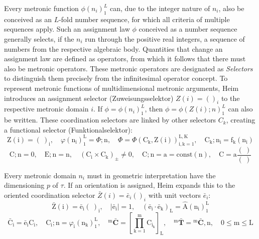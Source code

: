 \documentclass[12pt]{article}
\begin{document}
Every metronic function \( \phi(n_i)_1^L \) can, due to the integer nature of \( n_i \), also be conceived as an \( L \)-fold number sequence, for which all criteria of multiple sequences apply. Such an assignment law \( \phi \) conceived as a number sequence generally selects, if the \( n_i \) run through the positive real integers, a sequence of numbers from the respective algebraic body. Quantities that change an assignment law are defined as operators, from which it follows that there must also be metronic operators. These metronic operators are designated as \textit{Selectors} to distinguish them precisely from the infinitesimal operator concept. 
To represent metronic functions of multidimensional metronic arguments, Heim introduces an assignment selector (Zuweisungsselektor) \( Z(i) = ()_i \) to the respective metronic domain \( i \). If \( \phi = \phi(n_i)_1^L \), then \( \phi = \phi(Z(i); n)_1^L \) can also be written. These coordination selectors are linked by other selectors \( C_k \), creating a functional selector (Funktionalselektor):
\begin{equation}
\mathrm{Z(i)} = (\ )_\mathrm{i}, \quad \varphi(\mathrm{n_i})_1^\mathrm{L} = \Phi;\mathrm{n}, \quad \Phi = \Phi(\mathrm{C_k}, \mathrm{Z(i)})_{\mathrm{i,k=1}}^{\mathrm{L,K}}, \quad \mathrm{C_k};\mathrm{n_i} = \mathrm{f_k}(\mathrm{n_i}) \tag{78}
\end{equation}
\begin{equation}
\mathrm{C};\mathrm{n} = 0, \quad \mathrm{E};\mathrm{n} = \mathrm{n}, \quad (\mathrm{C_i} \times \mathrm{C_k})_\pm \neq 0, \quad \mathrm{C};\mathrm{n} = \mathrm{a} = \text{const}(\mathrm{n}), \quad \mathrm{C} = \mathrm{a} \frac{(\ )}{(\ )} \tag{78a}
\end{equation}

Every metronic domain \( n_i \) must in geometric interpretation have the dimensioning \( p \) of \( \tau \). If an orientation is assigned, Heim expands this to the oriented coordination selector \( \bar{Z}(i) = \bar{e}_i ()_i \) with unit vectors \( \bar{e}_i \):
\begin{equation}
\bar{\mathrm{Z}}(\mathrm{i}) = \bar{\mathrm{e}}_\mathrm{i} (\ )_\mathrm{i}, \quad |\bar{\mathrm{e}}_\mathrm{i}| = 1, \quad (\bar{\mathrm{e}}_\mathrm{i} \cdot \bar{\mathrm{e}}_\mathrm{k})_\mathrm{L} = \hat{\mathrm{A}}(\mathrm{n_i})_1^\mathrm{L} \tag{78b}
\end{equation}
\begin{equation}
\bar{\mathrm{C}}_\mathrm{i} = \bar{\mathrm{e}}_\mathrm{i} \mathrm{C_i}, \quad \mathrm{C_i};\mathrm{n} = \varphi_\mathrm{i}(\mathrm{n_k})_1^\mathrm{L}, \quad {}^\mathrm{m}\bar{\mathbf{C}} = \left[ \prod_{\mathrm{k}=1}^\mathrm{m} \mathrm{C}_{\mathrm{i_k}} \right]_\mathrm{L}, \quad {}^\mathrm{m}\bar{\mathbf{T}} = {}^\mathrm{m}\bar{\mathbf{C}}, \mathrm{n}, \quad 0 \le \mathrm{m} \le \mathrm{L} \tag{78c}
\end{equation}
\end{document}
